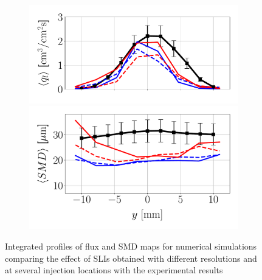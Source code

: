 \begin{figure}[h!]
\begin{subfigure}[b]{0.4\textwidth}
	\flushleft
   \includegraphics[scale=0.35]{./part2_developments/figures_ch6_lagrangian_JICF/params_resol_and_xInj/profiles/flux_along_y}\\
   \vspace{-0.16in}
   \includegraphics[scale=0.35]{./part2_developments/figures_ch6_lagrangian_JICF/params_resol_and_xInj/profiles/SMD_along_y}
\end{subfigure}

\caption{Integrated profiles of flux and SMD maps for numerical simulations comparing the effect of SLIs obtained with different resolutions and at several injection locations with the experimental results}
\label{fig:profiles_LGS_JICF_resol_and_xInj}
\end{figure}

